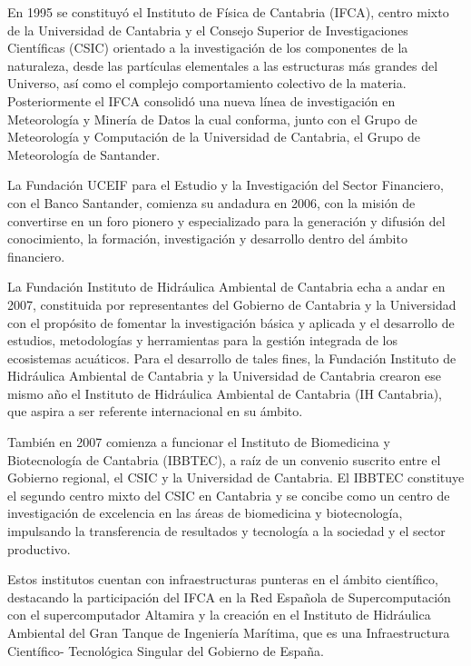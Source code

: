 En 1995 se constituyó el Instituto de Física de Cantabria (IFCA), centro mixto de la Universidad de Cantabria y el Consejo Superior de Investigaciones Científicas (CSIC) orientado a la investigación de los componentes de la naturaleza, desde las partículas elementales a las estructuras más grandes del Universo, así como el complejo comportamiento colectivo de la materia. Posteriormente el IFCA consolidó una nueva línea de investigación en Meteorología y Minería de Datos la cual conforma, junto con el Grupo de Meteorología y Computación de la Universidad de Cantabria, el Grupo de Meteorología de Santander.

La Fundación UCEIF para el Estudio y la Investigación del Sector Financiero, con el Banco Santander, comienza su andadura en 2006, con la misión de convertirse en un foro pionero y especializado para la generación y difusión del conocimiento, la formación, investigación y desarrollo dentro del ámbito financiero.

La Fundación Instituto de Hidráulica Ambiental de Cantabria echa a andar en 2007, constituida por representantes del Gobierno de Cantabria y la Universidad con el propósito de fomentar la investigación básica y aplicada y el desarrollo de estudios, metodologías y herramientas para la gestión integrada de los ecosistemas acuáticos. Para el desarrollo de tales fines, la Fundación Instituto de Hidráulica Ambiental de Cantabria y la Universidad de Cantabria crearon ese mismo año el Instituto de Hidráulica Ambiental de Cantabria (IH Cantabria), que aspira a ser referente internacional en su ámbito.
 
También en 2007 comienza a funcionar el Instituto de Biomedicina y Biotecnología de Cantabria (IBBTEC), a raíz de un convenio suscrito entre el Gobierno regional, el CSIC y la Universidad de Cantabria. El IBBTEC constituye el segundo centro mixto del CSIC en Cantabria y se concibe como un centro de investigación de excelencia en las áreas de biomedicina y biotecnología, impulsando la transferencia de resultados y tecnología a la sociedad y el sector productivo.

Estos institutos cuentan con infraestructuras punteras en el ámbito científico, destacando la participación del IFCA en la Red Española de Supercomputación con el supercomputador Altamira y la creación en el Instituto de Hidráulica Ambiental del Gran Tanque de Ingeniería Marítima, que es una Infraestructura Científico- Tecnológica Singular del Gobierno de España.

